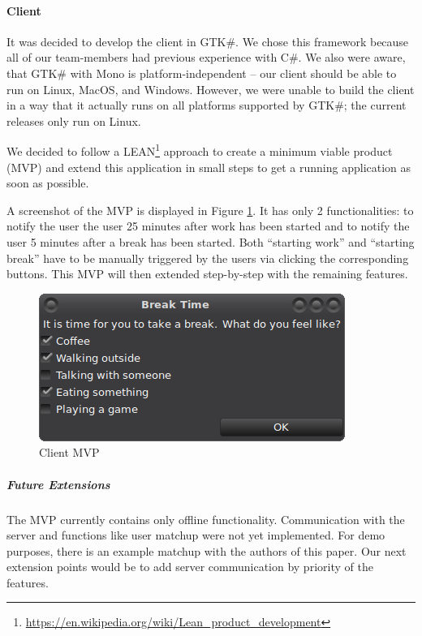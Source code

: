 

\paragraph{Client} It was decided to develop the client in GTK\#. We chose this framework because all of our 
team-members had previous experience with C\#. We also were aware, that GTK\# with Mono is platform-independent -- our 
client should be able to run on Linux, MacOS, and Windows. However, we were unable to build the client in a way that 
it actually runs on all platforms supported by GTK\#; the current releases only run on Linux.

We decided to follow a LEAN\footnote{\url{https://en.wikipedia.org/wiki/Lean_product_development}} approach to create 
a minimum viable product (MVP) and extend this application in small steps to get a running application as soon as 
possible.

A screenshot of the MVP is displayed in Figure \ref{fig:mvp-screenshot}. It has only 2 functionalities: to notify the 
user the user 25 minutes after work has been started and to notify the user 5 minutes after a break has been started. 
Both ``starting work'' and ``starting break'' have to be manually triggered by the users via clicking the 
corresponding buttons. This MVP will then extended step-by-step with the remaining features.

\begin{figure}
  \centering
  \includegraphics{images/mvp-screenshot.png}
  \caption{Client MVP}
  \label{fig:mvp-screenshot}
\end{figure}

\subparagraph{Future Extensions}
The MVP currently contains only offline functionality. Communication with the server and functions like user matchup were not yet implemented. For demo purposes, there is an example matchup with the authors of this paper. Our next extension points would be to add server communication by priority of the features.

